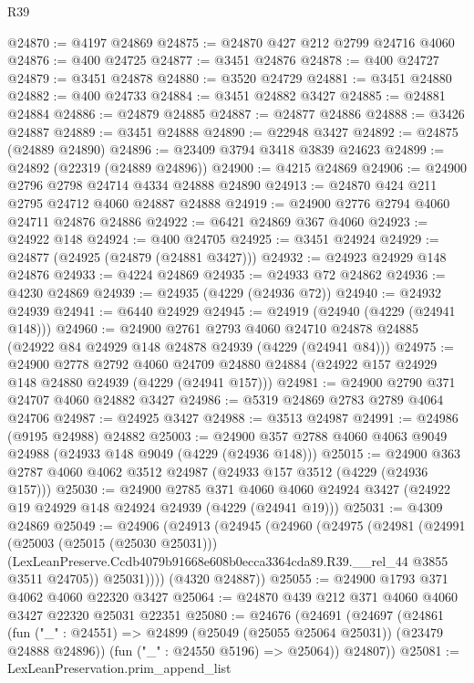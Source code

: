 \begin{lexlean}{R39}
\begin{coremodule}
@24870 := @4197 @24869
@24875 := @24870 @427 @212 @2799 @24716 @4060
@24876 := @400 @24725
@24877 := @3451 @24876
@24878 := @400 @24727
@24879 := @3451 @24878
@24880 := @3520 @24729
@24881 := @3451 @24880
@24882 := @400 @24733
@24884 := @3451 @24882 @3427
@24885 := @24881 @24884
@24886 := @24879 @24885
@24887 := @24877 @24886
@24888 := @3426 @24887
@24889 := @3451 @24888
@24890 := @22948 @3427
@24892 := @24875 (@24889 @24890)
@24896 := @23409 @3794 @3418 @3839 @24623
@24899 := @24892 (@22319 (@24889 @24896))
@24900 := @4215 @24869
@24906 := @24900 @2796 @2798 @24714 @4334 @24888 @24890
@24913 := @24870 @424 @211 @2795 @24712 @4060 @24887 @24888
@24919 := @24900 @2776 @2794 @4060 @24711 @24876 @24886
@24922 := @6421 @24869 @367 @4060
@24923 := @24922 @148
@24924 := @400 @24705
@24925 := @3451 @24924
@24929 := @24877 (@24925 (@24879 (@24881 @3427)))
@24932 := @24923 @24929 @148 @24876
@24933 := @4224 @24869
@24935 := @24933 @72 @24862
@24936 := @4230 @24869
@24939 := @24935 (@4229 (@24936 @72))
@24940 := @24932 @24939
@24941 := @6440 @24929
@24945 := @24919 (@24940 (@4229 (@24941 @148)))
@24960 := @24900
    @2761
    @2793
    @4060
    @24710
    @24878
    @24885
    (@24922 @84 @24929 @148 @24878 @24939 (@4229 (@24941 @84)))
@24975 := @24900
    @2778
    @2792
    @4060
    @24709
    @24880
    @24884
    (@24922 @157 @24929 @148 @24880 @24939 (@4229 (@24941 @157)))
@24981 := @24900 @2790 @371 @24707 @4060 @24882 @3427
@24986 := @5319 @24869 @2783 @2789 @4064 @24706
@24987 := @24925 @3427
@24988 := @3513 @24987
@24991 := @24986 (@9195 @24988) @24882
@25003 := @24900 @357 @2788 @4060 @4063 @9049 @24988 (@24933 @148 @9049 (@4229 (@24936 @148)))
@25015 := @24900 @363 @2787 @4060 @4062 @3512 @24987 (@24933 @157 @3512 (@4229 (@24936 @157)))
@25030 := @24900
    @2785
    @371
    @4060
    @4060
    @24924
    @3427
    (@24922 @19 @24929 @148 @24924 @24939 (@4229 (@24941 @19)))
@25031 := @4309 @24869
@25049 := @24906
    (@24913
      (@24945
        (@24960
          (@24975
            (@24981
              (@24991
                (@25003 (@25015 (@25030 @25031)))
                (LexLeanPreserve.Ccdb4079b91668e608b0ecca3364cda89.R39.__rel_44 @3855 @3511 @24705))
              @25031))))
      (@4320 @24887))
@25055 := @24900 @1793 @371 @4062 @4060 @22320 @3427
@25064 := @24870 @439 @212 @371 @4060 @4060 @3427 @22320 @25031 @22351
@25080 := @24676
    (@24691
      (@24697
        (@24861
          (fun ("_" : @24551) => @24899 (@25049 (@25055 @25064 @25031)) (@23479 @24888 @24896))
          (fun ("_" : @24550 @5196) => @25064))
        @24807))
@25081 := LexLeanPreservation.prim_append_list

\end{coremodule}
\end{lexlean}
